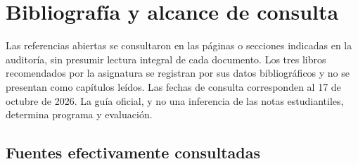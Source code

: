 \chapter{Bibliografía y alcance de consulta}\label{app:bib}
Las referencias abiertas se consultaron en las páginas o secciones indicadas en la auditoría, sin presumir lectura integral de cada documento. Los tres libros recomendados por la asignatura se registran por sus datos bibliográficos y no se presentan como capítulos leídos. Las fechas de consulta corresponden al 17 de octubre de 2026. La guía oficial, y no una inferencia de las notas estudiantiles, determina programa y evaluación.
\section*{Fuentes efectivamente consultadas}
\begingroup\makeatletter\renewcommand\chapter{\@ifstar\@gobble\@gobble}\makeatother
